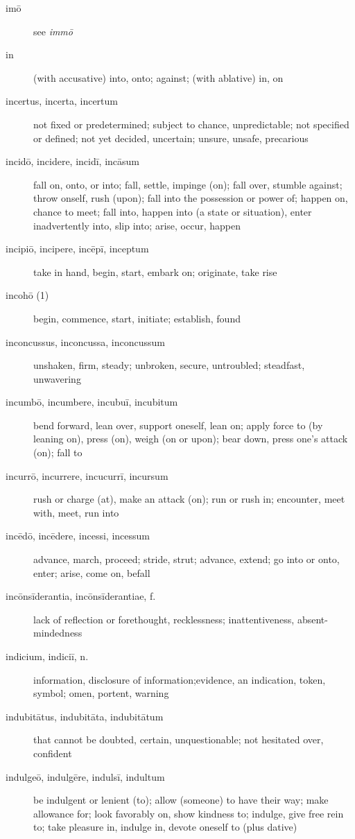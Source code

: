 \begin{description}
    \item[imō] see \textit{immō}
    \item[in] \marginnote{*}(with accusative) into, onto; against; (with ablative) in, on
    \item[incertus, incerta, incertum] not fixed or predetermined; subject to chance, unpredictable; not specified or defined; not yet decided, uncertain; unsure, unsafe, precarious
    \item[incidō, incidere, incidī, incāsum] \marginnote{*}fall on, onto, or into; fall, settle, impinge (on); fall over, stumble against; throw onself, rush (upon); fall into the possession or power of; happen on, chance to meet; fall into, happen into (a state or situation), enter inadvertently into, slip into; arise, occur, happen
    \item[incipiō, incipere, incēpī, inceptum] \marginnote{*}take in hand, begin, start, embark on; originate, take rise
    \item[incohō (1)] begin, commence, start, initiate; establish, found
    \item[inconcussus, inconcussa, inconcussum] unshaken, firm, steady; unbroken, secure, untroubled; steadfast, unwavering
    \item[incumbō, incumbere, incubuī, incubitum] bend forward, lean over, support oneself, lean on; apply force to (by leaning on), press (on), weigh (on or upon); bear down, press one's attack (on); fall to
    \item[incurrō, incurrere, incucurrī, incursum] rush or charge (at), make an attack (on); run or rush in; encounter, meet with, meet, run into
    \item[incēdō, incēdere, incessi, incessum] advance, march, proceed; stride, strut; advance, extend; go into or onto, enter; arise, come on, befall
    \item[incōnsīderantia, incōnsīderantiae, f.] lack of reflection or forethought, recklessness; inattentiveness, absent-mindedness
    \item[indicium, indiciī, n.] information, disclosure of information;evidence, an indication, token, symbol; omen, portent, warning
    \item[indubitātus, indubitāta, indubitātum] that cannot be doubted, certain, unquestionable; not hesitated over, confident
    \item[indulgeō, indulgēre, indulsī, indultum] be indulgent or lenient (to); allow (someone) to have their way; make allowance for; look favorably on, show kindness to; indulge, give free rein to; take pleasure in, indulge in, devote oneself to (plus dative)

\end{description}
